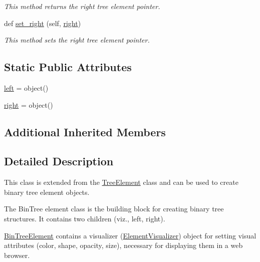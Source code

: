 \begin{DoxyCompactItemize}
\begin{DoxyCompactList}\small\item\em This method returns the right tree element pointer. \end{DoxyCompactList}\item 
def \mbox{\hyperlink{class_bridges_1_1_bin_tree_element_1_1_bin_tree_element_ac93c9e5553a10645c6157a14fe85dda6}{set\+\_\+right}} (self, \mbox{\hyperlink{class_bridges_1_1_bin_tree_element_1_1_bin_tree_element_a5130987f56eff4edcc8c8ef323f8cd3d}{right}})
\begin{DoxyCompactList}\small\item\em This method sets the right tree element pointer. \end{DoxyCompactList}\end{DoxyCompactItemize}
\subsection*{Static Public Attributes}
\begin{DoxyCompactItemize}
\item 
\mbox{\hyperlink{class_bridges_1_1_bin_tree_element_1_1_bin_tree_element_ae2011efda691620e8c76e366131b0195}{left}} = object()
\item 
\mbox{\hyperlink{class_bridges_1_1_bin_tree_element_1_1_bin_tree_element_a5130987f56eff4edcc8c8ef323f8cd3d}{right}} = object()
\end{DoxyCompactItemize}
\subsection*{Additional Inherited Members}


\subsection{Detailed Description}
This class is extended from the \mbox{\hyperlink{namespace_bridges_1_1_tree_element}{Tree\+Element}} class and can be used to create binary tree element objects. 

The Bin\+Tree element class is the building block for creating binary tree structures. It contains two children (viz., left, right).

\mbox{\hyperlink{class_bridges_1_1_bin_tree_element_1_1_bin_tree_element}{Bin\+Tree\+Element}} contains a visualizer (\mbox{\hyperlink{namespace_bridges_1_1_element_visualizer}{Element\+Visualizer}}) object for setting visual attributes (color, shape, opacity, size), necessary for displaying them in a web browser.

